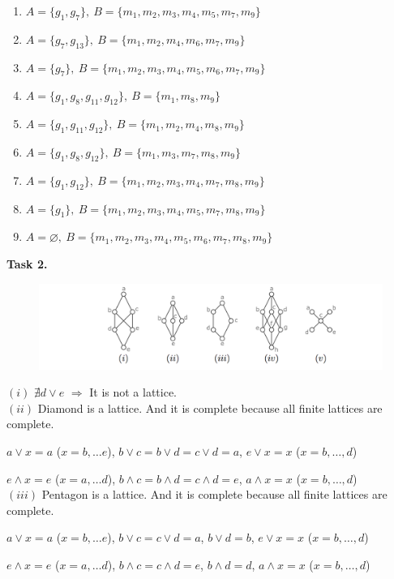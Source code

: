 \documentclass{article}
\begin{document}
\begin{enumerate}
	\item {$A = \{g_1,g_7\},~B = \{m_1,m_2,m_3,m_4,m_5,m_7,m_9\}$}
	\item {$A = \{g_7,g_{13}\},~B = \{m_1,m_2,m_4,m_6,m_7,m_9\}$}
	\item {$A = \{g_7\},~B = \{m_1,m_2,m_3,m_4,m_5,m_6,m_7,m_9\}$}
	\item {$A = \{g_1,g_8,g_{11},g_{12}\},~B = \{m_1,m_8,m_9\}$}
	\item {$A = \{g_1,g_{11},g_{12}\},~B = \{m_1,m_2,m_4,m_8,m_9\}$}
	\item {$A = \{g_1,g_8,g_{12}\},~B = \{m_1,m_3,m_7,m_8,m_9\}$}
	\item {$A = \{g_1,g_{12}\},~B = \{m_1,m_2,m_3,m_4,m_7,m_8,m_9\}$}
	\item {$A = \{g_1\},~B = \{m_1,m_2,m_3,m_4,m_5,m_7,m_8,m_9\}$}
	\item {$A = \varnothing,~B = \{m_1,m_2,m_3,m_4,m_5,m_6,m_7,m_8,m_9\}$}
\end{enumerate}

\textbf{Task 2.}

\begin{figure}[h]
	\includegraphics[width=\linewidth]{2.png}
\end{figure}

$(i)$ $\nexists d \lor e$ $\Rightarrow$ It is not a lattice.\\

$(ii)$ Diamond is a lattice. And it is complete because all finite lattices are complete.

$a \lor x = a$ ($x = b, \dots e$), $b \lor c = b \lor d = c \lor d = a$, $e \lor x = x$ ($x = b, \dots, d$)

$e \land x = e$ ($x = a, \dots d$), $b \land c = b \land d = c \land d = e$, $a \land x = x$ ($x = b, \dots, d$)\\

$(iii)$ Pentagon is a lattice. And it is complete because all finite lattices are complete.

$a \lor x = a$ ($x = b, \dots e$), $b \lor c = c \lor d = a$, $b \lor d = b$, $e \lor x = x$ ($x = b, \dots, d$)

$e \land x = e$ ($x = a, \dots d$), $b \land c = c \land d = e$, $b \land d = d$, $a \land x = x$ ($x = b, \dots, d$)\\
\end{document}
